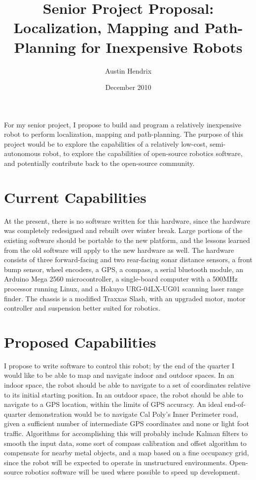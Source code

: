 \documentclass[a4paper,12pt]{article}
\begin{document}
\title{Senior Project Proposal: Localization, Mapping and Path-Planning for Inexpensive Robots}
\author{Austin Hendrix}
\date{December 2010}
\maketitle


For my senior project, I propose to build and program a relatively inexpensive robot to perform localization, mapping and path-planning. The purpose of this project would be to explore the capabilities of a relatively low-cost, semi-autonomous robot, to explore the capabilities of open-source robotics software, and potentially contribute back to the open-source community.

\section{Current Capabilities}

At the present, there is no software written for this hardware, since the hardware was completely redesigned and rebuilt over winter break. Large portions of the existing software should be portable to the new platform, and the lessons learned from the old software will apply to the new hardware as well. The hardware consists of three forward-facing and two rear-facing sonar distance sensors, a front bump sensor, wheel encoders, a GPS, a compass, a serial bluetooth module, an Arduino Mega 2560 microcontroller, a single-board computer with a 500MHz processor running Linux, and a Hokuyo URG-04LX-UG01 scanning laser range finder. The chassis is a modified Traxxas Slash, with an upgraded motor, motor controller and suspension better suited for robotics. 

\section{Proposed Capabilities}

I propose to write software to control this robot; by the end of the quarter I would like to be able to map and navigate indoor and outdoor spaces. In an indoor space, the robot should be able to navigate to a set of coordinates relative to its initial starting position. In an outdoor space, the robot should be able to navigate to a GPS location, within the limits of GPS accuracy. An ideal end-of-quarter demonstration would be to navigate Cal Poly's Inner Perimeter road, given a sufficient number of intermediate GPS coordinates and none or light foot traffic. Algorithms for accomplishing this will probably include Kalman filters to smooth the input data, some sort of compass calibration and offset algorithm to compensate for nearby metal objects, and a map based on a fine occupancy grid, since the robot will be expected to operate in unstructured environments. Open-source robotics software will be used where possible to speed up development. 
\end{document}
